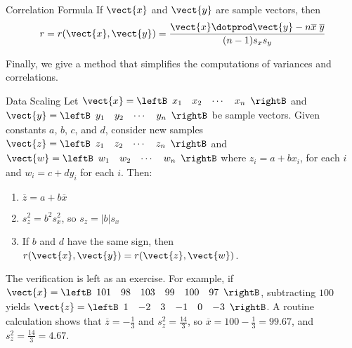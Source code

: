 \begin{theorem*}[label=thm:017431]{Correlation Formula}
If $\vect{x}$ and $\vect{y}$ are sample vectors, then
\begin{equation*}
r = r(\vect{x}, \vect{y}) = \dfrac{\vect{x} \dotprod \vect{y} - n \overline{x} \; \overline{y}}{(n - 1)s_xs_y} \index{correlation formula}
\end{equation*}
\end{theorem*}

Finally, we give a method that simplifies the computations of variances and correlations.

\begin{theorem*}[label=thm:017436]{Data Scaling}
Let $\vect{x} = 
\leftB \begin{array}{cccc}
x_{1} & x_{2} & \cdots & x_{n}
\end{array} \rightB$ and $\vect{y} = 
\leftB \begin{array}{cccc}
y_{1} & y_{2} & \cdots & y_{n}
\end{array} \rightB$ be sample vectors. Given constants $a$, $b$, $c$, and $d$, consider new samples $\vect{z} = 
\leftB \begin{array}{cccc}
z_{1} & z_{2} & \cdots & z_{n}
\end{array} \rightB$ and $\vect{w} = 
\leftB \begin{array}{cccc}
w_{1} & w_{2} & \cdots & w_{n}
\end{array} \rightB$ where $z_{i} = a + bx_{i}$, for each $i$ and $w_{i} = c + dy_{i}$ for each $i$. Then:

\begin{enumerate}[label={\alph*.}]
\item $\overline{z} = a + b\overline{x}$

\item $s_z^2 = b^2s_x^2$, so $s_z = |b|s_x$

\item If $b$ and $d$ have the same sign, then $r(\vect{x}, \vect{y}) = r(\vect{z}, \vect{w})$.

\end{enumerate}
\end{theorem*}

\noindent The verification is left as an exercise. For example, if $\vect{x} = 
\leftB \begin{array}{cccccc}
101 & 98 & 103 & 99 & 100 & 97
\end{array} \rightB$, subtracting $100$ yields $\vect{z} = 
\leftB \begin{array}{cccccc}
1 & -2 & 3 & -1 & 0 & -3
\end{array} \rightB$. A routine calculation shows that $\overline{z} = -\frac{1}{3}$ and $s_z^2 = \frac{14}{3}$, so $\overline{x} = 100 - \frac{1}{3} = 99.67$, and $s_z^2 = \frac{14}{3} = 4.67$.
